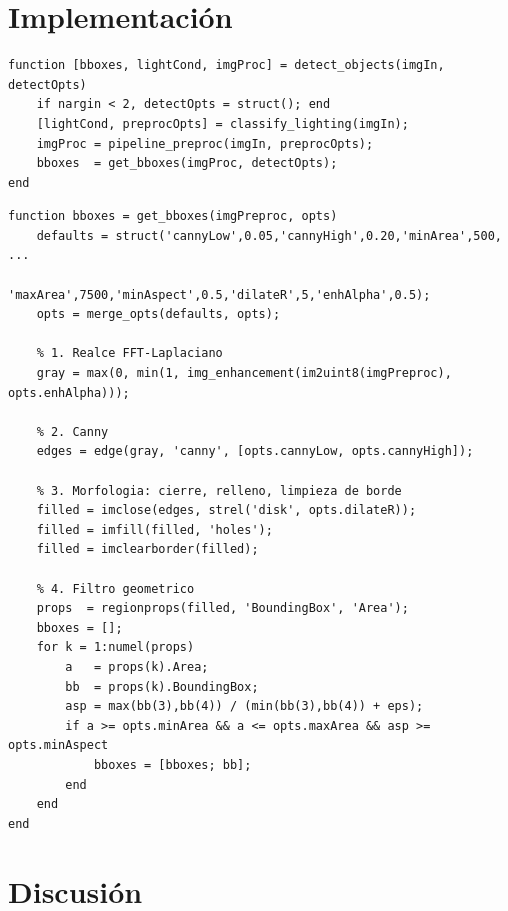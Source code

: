 \documentclass[11pt,a4paper]{article}
\begin{document}
\section{Implementación}
\label{sec:impl}

\begin{lstlisting}[caption={\texttt{src/detection/detect\_objects.m} — orquestador del pipeline completo.}]
function [bboxes, lightCond, imgProc] = detect_objects(imgIn, detectOpts)
    if nargin < 2, detectOpts = struct(); end
    [lightCond, preprocOpts] = classify_lighting(imgIn);
    imgProc = pipeline_preproc(imgIn, preprocOpts);
    bboxes  = get_bboxes(imgProc, detectOpts);
end
\end{lstlisting}

\begin{lstlisting}[caption={\texttt{src/detection/get\_bboxes.m} — detección con Enhancement + Canny + morfología.}]
function bboxes = get_bboxes(imgPreproc, opts)
    defaults = struct('cannyLow',0.05,'cannyHigh',0.20,'minArea',500, ...
                      'maxArea',7500,'minAspect',0.5,'dilateR',5,'enhAlpha',0.5);
    opts = merge_opts(defaults, opts);

    % 1. Realce FFT-Laplaciano
    gray = max(0, min(1, img_enhancement(im2uint8(imgPreproc), opts.enhAlpha)));

    % 2. Canny
    edges = edge(gray, 'canny', [opts.cannyLow, opts.cannyHigh]);

    % 3. Morfologia: cierre, relleno, limpieza de borde
    filled = imclose(edges, strel('disk', opts.dilateR));
    filled = imfill(filled, 'holes');
    filled = imclearborder(filled);

    % 4. Filtro geometrico
    props  = regionprops(filled, 'BoundingBox', 'Area');
    bboxes = [];
    for k = 1:numel(props)
        a   = props(k).Area;
        bb  = props(k).BoundingBox;
        asp = max(bb(3),bb(4)) / (min(bb(3),bb(4)) + eps);
        if a >= opts.minArea && a <= opts.maxArea && asp >= opts.minAspect
            bboxes = [bboxes; bb];
        end
    end
end
\end{lstlisting}

\section{Discusión}
\label{sec:discusion}
\end{document}
